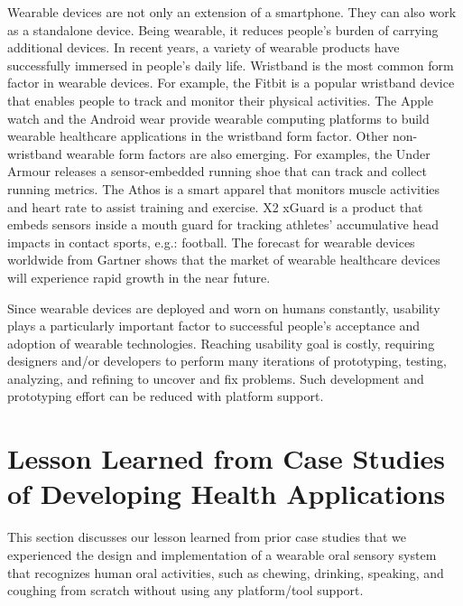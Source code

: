 Wearable devices are not only an extension of a smartphone. They can also work as a standalone device. Being wearable, it reduces people's burden of carrying additional devices. In recent years, a variety of wearable products have successfully immersed in people's daily life. Wristband is the most common form factor in wearable devices. For example, the Fitbit \cite{Fitbit} is a popular wristband device that enables people to track and monitor their physical activities. The Apple watch \cite{Apple_watch} and the Android wear \cite{Android_wear} provide wearable computing platforms to build wearable healthcare applications in the wristband form factor. Other non-wristband wearable form factors are also emerging. For examples, the Under Armour \cite{Under_armour} releases a sensor-embedded running shoe that can track and collect running metrics. The Athos \cite{Athos} is a smart apparel that monitors muscle activities and heart rate to assist training and exercise. X2 xGuard \cite{X2_xGuard, camarillo2013head} is a product that embeds sensors inside a mouth guard for tracking athletes' accumulative head impacts in contact sports, e.g.: football. The forecast for wearable devices worldwide from Gartner \cite{gartner2016wearable} shows that the market of wearable healthcare devices will experience rapid growth in the near future. 


Since wearable devices are deployed and worn on humans constantly, usability plays a particularly important factor to successful people's acceptance and adoption of wearable technologies. Reaching usability goal is costly, requiring designers and/or developers to perform many iterations of prototyping, testing, analyzing, and refining to uncover and fix problems. Such development and prototyping effort can be reduced with platform support. 


\section{Lesson Learned from Case Studies of Developing Health Applications}
This section discusses our lesson learned from prior case studies that we experienced the design and implementation of a wearable oral sensory system that recognizes human oral activities, such as chewing, drinking, speaking, and coughing from scratch without using any platform/tool support. 

